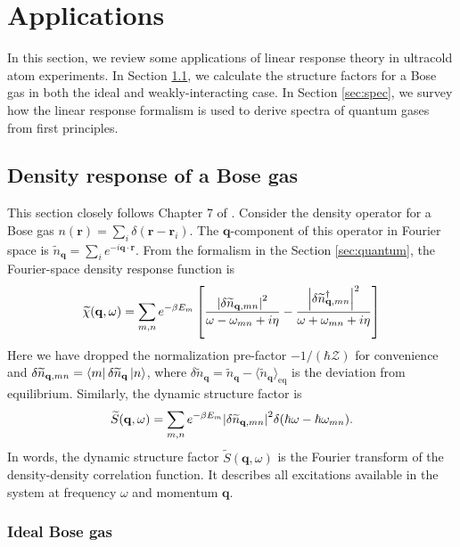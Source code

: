 \documentclass[reprint,
nofootinbib,
amsmath,amssymb,
aps]{revtex4-1}
\newcommand{\be}{\beta}
\newcommand{\f}[2]{\frac{#1}{#2}}
\newcommand{\lb}{\left[}
\newcommand{\rb}{\right]}
\begin{document}
\section{Applications}
In this section, we review some applications of linear response theory in ultracold atom experiments. In Section \ref{sec:Bose}, we calculate the structure factors for a Bose gas in both the ideal and weakly-interacting case. In Section \ref{sec:spec}, we survey how the linear response formalism is used to derive spectra of quantum gases from first principles.

\subsection{Density response of a Bose gas}
\label{sec:Bose}
This section closely follows Chapter 7 of \cite{pitaevskii2016bose}. Consider the density operator for a Bose gas $n(\mathbf{r}) = \sum_i \delta(\mathbf{r} - \mathbf{r}_i)$. The $\mathbf{q}$-component of this operator in Fourier space is $\widetilde{n}_\mathbf{q} = \sum_i e^{-i \mathbf{q}\cdot \mathbf{r}}$. From the formalism in the Section \ref{sec:quantum}, the Fourier-space density response function is
\begin{align*}
\widetilde{\chi}(\mathbf{q},\omega) = \sum_{m,n} e^{-\be E_m} 
\lb 
\f{\abs{\delta \widetilde{n}_{\mathbf{q},mn}}^2}{\omega - \omega_{mn} + i\eta} 
- 
\f{\abs{\delta \widetilde{n}_{\mathbf{q},mn}^\dagger}^2}{\omega + \omega_{mn} + i\eta} 
\rb
\end{align*}
Here we have dropped the normalization pre-factor $-1/(\hbar \mathcal{Z})$ for convenience and $\delta \widetilde{n}_{\mathbf{q},mn} = \bra{m} \delta \widetilde{n}_{\mathbf{q}} \ket{n}$, where $\delta \widetilde{n}_\mathbf{q} = \widetilde{n}_\mathbf{q} - \langle \widetilde{n}_\mathbf{q} \rangle_\text{eq}$ is the deviation from equilibrium. Similarly, the dynamic structure factor is 
\begin{align*}
\widetilde{S}(\mathbf{q},\omega) = \sum_{m,n} e^{-\be E_m} \abs{\delta \widetilde{n}_{\mathbf{q},mn}}^2 \delta(\hbar \omega - \hbar \omega_{mn}).
\end{align*}
In words, the dynamic structure factor $\widetilde{S}(\mathbf{q},\omega)$ is the Fourier transform of the density-density correlation function. It describes all excitations available in the system at frequency $\omega$ and momentum $\mathbf{q}$. 

\subsubsection{Ideal Bose gas}
\end{document}
